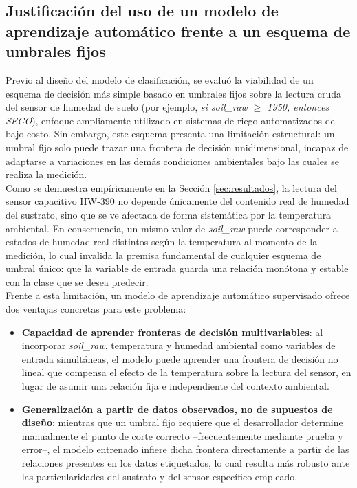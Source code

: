 \documentclass[12pt,a4paper]{article}
\begin{document}
\subsection{Justificación del uso de un modelo de aprendizaje automático frente a un esquema de umbrales fijos}

Previo al diseño del modelo de clasificación, se evaluó la viabilidad de un esquema de decisión más simple basado en umbrales fijos sobre la lectura cruda del sensor de humedad de suelo (por ejemplo, \textit{si soil\_raw $\geq$ 1950, entonces SECO}), enfoque ampliamente utilizado en sistemas de riego automatizados de bajo costo. Sin embargo, este esquema presenta una limitación estructural: un umbral fijo solo puede trazar una frontera de decisión unidimensional, incapaz de adaptarse a variaciones en las demás condiciones ambientales bajo las cuales se realiza la medición.\\

Como se demuestra empíricamente en la Sección \ref{sec:resultados}, la lectura del sensor capacitivo HW-390 no depende únicamente del contenido real de humedad del sustrato, sino que se ve afectada de forma sistemática por la temperatura ambiental. En consecuencia, un mismo valor de \textit{soil\_raw} puede corresponder a estados de humedad real distintos según la temperatura al momento de la medición, lo cual invalida la premisa fundamental de cualquier esquema de umbral único: que la variable de entrada guarda una relación monótona y estable con la clase que se desea predecir.\\

Frente a esta limitación, un modelo de aprendizaje automático supervisado ofrece dos ventajas concretas para este problema:

\begin{itemize}
    \item \textbf{Capacidad de aprender fronteras de decisión multivariables}: al incorporar \textit{soil\_raw}, temperatura y humedad ambiental como variables de entrada simultáneas, el modelo puede aprender una frontera de decisión no lineal que compensa el efecto de la temperatura sobre la lectura del sensor, en lugar de asumir una relación fija e independiente del contexto ambiental.
    \item \textbf{Generalización a partir de datos observados, no de supuestos de diseño}: mientras que un umbral fijo requiere que el desarrollador determine manualmente el punto de corte correcto --frecuentemente mediante prueba y error--, el modelo entrenado infiere dicha frontera directamente a partir de las relaciones presentes en los datos etiquetados, lo cual resulta más robusto ante las particularidades del sustrato y del sensor específico empleado.
\end{itemize}
\end{document}
